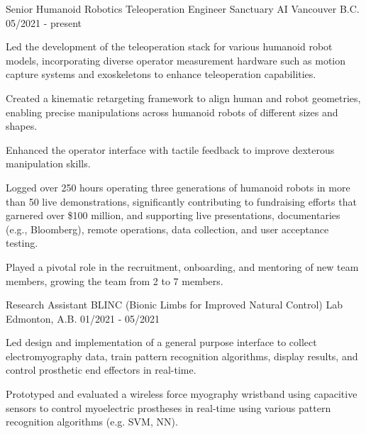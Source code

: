 

\begin{cventries}

  \cventry
    {Senior Humanoid Robotics Teleoperation Engineer} %
    {Sanctuary AI} %
    {Vancouver B.C.} %
    {05/2021 - present} %
    {
      \begin{cvitems}
        \item {Led the development of the teleoperation stack for various humanoid robot models, incorporating diverse operator measurement hardware such as motion capture systems and exoskeletons to enhance teleoperation capabilities.}
        \item {Created a kinematic retargeting framework to align human and robot geometries, enabling precise manipulations across humanoid robots of different sizes and shapes.}
        \item {Enhanced the operator interface with tactile feedback to improve dexterous manipulation skills.}
        \item {Logged over 250 hours operating three generations of humanoid robots in more than 50 live demonstrations, significantly contributing to fundraising efforts that garnered over \$100 million, and supporting live presentations, documentaries (e.g., Bloomberg), remote operations, data collection, and user acceptance testing.}
        \item {Played a pivotal role in the recruitment, onboarding, and mentoring of new team members, growing the team from 2 to 7 members.}
      \end{cvitems}
    }

  \cventry
    {Research Assistant} %
    {BLINC (Bionic Limbs for Improved Natural Control) Lab} %
    {Edmonton, A.B.} %
    {01/2021 - 05/2021} %
    {
      \begin{cvitems}
        \item {Led design and implementation of a general purpose interface to collect electromyography data, train pattern recognition algorithms, display results, and control prosthetic end effectors in real-time.}
        \item {Prototyped and evaluated a wireless force myography wristband using capacitive sensors to control myoelectric prostheses in real-time using various pattern recognition algorithms (e.g. SVM, NN).}
      \end{cvitems}
    }


\end{cventries}
